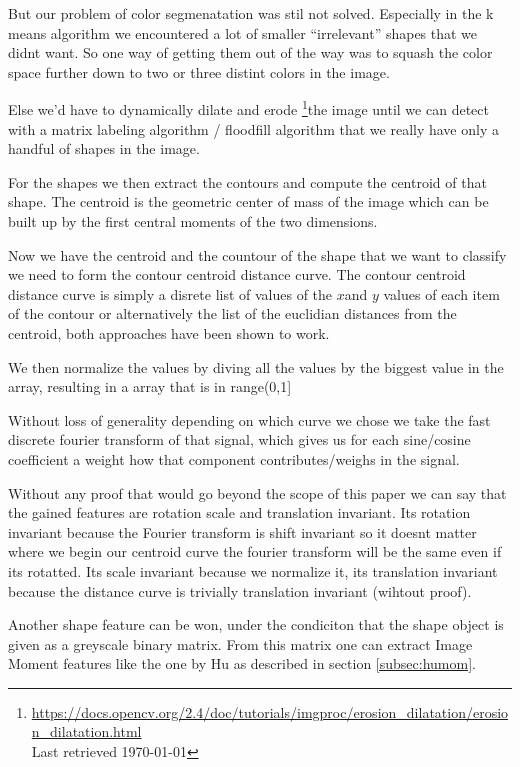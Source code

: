 \documentclass[journal]{vgtc}       %
\begin{document}
But our problem of color segmenatation was stil not solved. Especially in the k means algorithm we encountered a lot of smaller ``irrelevant'' shapes that we didnt want.
So one way of getting them out of the way was to squash the color space further down to two or three distint colors in the image.

Else we'd have to dynamically dilate and erode \footnote{\url{https://docs.opencv.org/2.4/doc/tutorials/imgproc/erosion_dilatation/erosion_dilatation.html}\\ Last retrieved \today}the image until we can detect with a matrix labeling algorithm /  floodfill algorithm that we really have only a handful of shapes in the image.

For the shapes we then extract the contours and compute the centroid of that shape.
The centroid is the geometric center of mass of the image which can be built up by the first central moments of the two dimensions.

Now we have the centroid and the countour of the shape that we want to classify we need to form the contour centroid distance curve.
The contour centroid distance curve is simply a disrete list of values of the \(x\)and \(y\)  values of each item of the contour  or alternatively the list of the euclidian  distances from the centroid, both approaches have been shown to work.

We then normalize the values by diving all the values by the biggest value in the array, resulting in a array that is in range(0,1]

Without loss of generality depending on which curve we chose we take the fast discrete fourier transform of that signal, which gives us for each sine/cosine coefficient a weight how that component contributes/weighs in the signal.

Without any proof that would go beyond the scope of this paper we can say that the gained features are rotation scale and translation invariant. Its rotation invariant because the Fourier transform is shift invariant so it doesnt matter where we begin our centroid curve the fourier transform will be the same even if its rotatted. Its scale invariant because we normalize it, its translation invariant because the distance curve is trivially translation invariant (wihtout proof).

Another shape feature can be won, under the condiciton that the shape object is given as a greyscale binary matrix. From this matrix one can extract Image Moment features like the one by Hu as described in section \ref{subsec:humom}.
\end{document}
